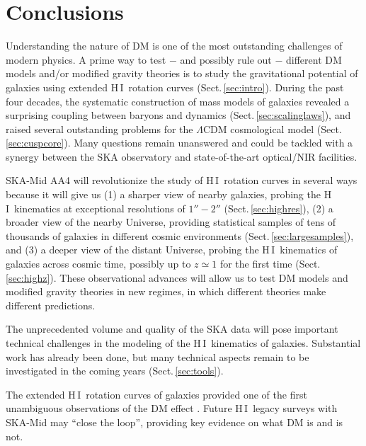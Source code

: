 \documentclass[a4paper,11pt]{article}
\newcommand{\hi } {{\rm H}\,{\small\rm I}}
\begin{document}
\section{Conclusions}
\label{sec:summary}

Understanding the nature of DM is one of the most outstanding challenges of modern physics. A prime way to test $-$ and possibly rule out $-$ different DM models and/or modified gravity theories is to study the gravitational potential of galaxies using extended \hi\ rotation curves (Sect.\,\ref{sec:intro}). During the past four decades, the systematic construction of mass models of galaxies revealed a surprising coupling between baryons and dynamics (Sect.\,\ref{sec:scalinglaws}), and raised several outstanding problems for the $\Lambda$CDM cosmological model (Sect.\,\ref{sec:cuspcore}). Many questions remain unanswered and could be tackled with a synergy between the SKA observatory and state-of-the-art optical/NIR facilities.

SKA-Mid AA4 will revolutionize the study of \hi\ rotation curves in several ways because it will give us (1) a sharper view of nearby galaxies, probing the \hi\ kinematics at exceptional resolutions of $1''-2''$ (Sect.\,\ref{sec:highres}), (2) a broader view of the nearby Universe, providing statistical samples of tens of thousands of galaxies in different cosmic environments (Sect.\,\ref{sec:largesamples}), and (3) a deeper view of the distant Universe, probing the \hi\ kinematics of galaxies across cosmic time, possibly up to $z\simeq1$ for the first time (Sect.\,\ref{sec:highz}). These observational advances will allow us to test DM models and modified gravity theories in new regimes, in which different theories make different predictions.

The unprecedented volume and quality of the SKA data will pose important technical challenges in the modeling of the \hi\ kinematics of galaxies. Substantial work has already been done, but many technical aspects remain to be investigated in the coming years (Sect.\,\ref{sec:tools}). 

The extended \hi\ rotation curves of galaxies provided one of the first unambiguous observations of the DM effect \citep[see][for such history]{Sanders2010, Bertone2018}. Future \hi\ legacy surveys with SKA-Mid may ``close the loop'', providing key evidence on what DM is and is not.


\end{document}
